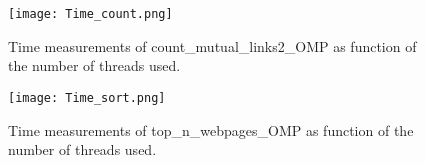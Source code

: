 \documentclass[12pt,a4paper,english]{article}
\begin{document}
\begin{figure}[htbp!]
	\centering\texttt{[image: Time\_count.png]}
	\caption{Time measurements of count\_mutual\_links2\_OMP as function of the number of threads used. \label{fig:Time_count}}
\end{figure} 

\begin{figure}[htbp!]
	\centering\texttt{[image: Time\_sort.png]}
	\caption{Time measurements of top\_n\_webpages\_OMP as function of the number of threads used. \label{fig:Time_sort}}
\end{figure} 



\end{document}
